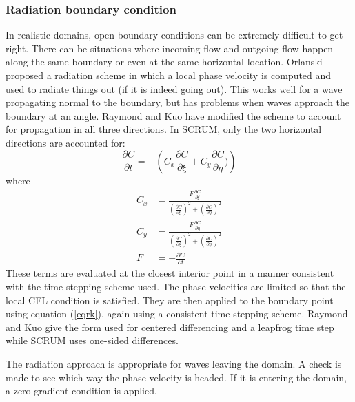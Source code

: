 \subsubsection{Radiation boundary condition}
In realistic domains, open boundary conditions can be extremely
difficult to get right. There can be situations where incoming flow and
outgoing flow happen along the same boundary or even at the same
horizontal location. Orlanski \cite{Orlanski76} proposed a radiation
scheme in which a local phase velocity is computed and used to radiate
things out (if it is indeed going out). This works well for a wave
propagating normal to the boundary, but has problems when waves
approach the boundary at an angle. Raymond and Kuo \cite{Raymond84}
have modified the scheme to account for propagation in all three
directions. In SCRUM, only the two horizontal directions are accounted
for:
\begin{equation}
   \frac{\partial C}{\partial t} = - \left( C_x \frac{\partial
   C}{\partial \xi} + C_y \frac{\partial C}{\partial \eta}) \right)
\label{eqrk}
\end{equation}
where
\begin{align}
   C_x & = \frac{F \frac{\partial C}{\partial \xi}}{
   \left( \frac{\partial C}{\partial \xi} \right)^2 +
   \left( \frac{\partial C}{\partial \eta} \right)^2 } \\
   C_y & = \frac{F \frac{\partial C}{\partial \eta}}{
   \left( \frac{\partial C}{\partial \xi} \right)^2 +
   \left( \frac{\partial C}{\partial \eta} \right)^2 } \\
   F & = - \frac{\partial C}{\partial t}
\end{align}
These terms are evaluated at the closest interior point in a manner
consistent with the time stepping scheme used. The phase velocities are
limited so that the local CFL condition is satisfied. They are then
applied to the boundary point using equation (\ref{eqrk}), again using
a consistent time stepping scheme. Raymond and Kuo give the form used
for centered differencing and a leapfrog time step while SCRUM uses
one-sided differences.

The radiation approach is appropriate for waves leaving the domain. A
check is made to see which way the phase velocity is headed. If it is
entering the domain, a zero gradient condition is applied.
